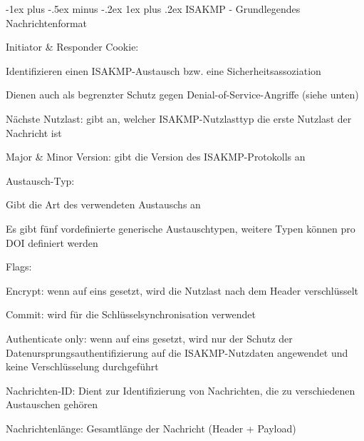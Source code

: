 \documentclass[a4paper]{article}
\makeatletter
\renewcommand{\subsubsection}{\@startsection{subsubsection}{3}{0mm}%
 {-1ex plus -.5ex minus -.2ex}%
 {1ex plus .2ex}%
 {\normalfont\small\bfseries}}
\makeatother
\begin{document}
\begin{multicols}{3}
      \subsubsection{ISAKMP - Grundlegendes Nachrichtenformat}
      \begin{itemize*}
            \item Initiator \& Responder Cookie:
            \begin{itemize*}
                  \item Identifizieren einen ISAKMP-Austausch bzw. eine Sicherheitsassoziation
                  \item Dienen auch als begrenzter Schutz gegen Denial-of-Service-Angriffe (siehe unten)
            \end{itemize*}
            \item Nächste Nutzlast: gibt an, welcher ISAKMP-Nutzlasttyp die erste Nutzlast der Nachricht ist
            \item Major \& Minor Version: gibt die Version des ISAKMP-Protokolls an
            \item Austausch-Typ:
            \begin{itemize*}
                  \item Gibt die Art des verwendeten Austauschs an
                  \item Es gibt fünf vordefinierte generische Austauschtypen, weitere Typen können pro DOI definiert werden
            \end{itemize*}
            \item Flags:
            \begin{itemize*}
                  \item Encrypt: wenn auf eins gesetzt, wird die Nutzlast nach dem Header verschlüsselt
                  \item Commit: wird für die Schlüsselsynchronisation verwendet
                  \item Authenticate only: wenn auf eins gesetzt, wird nur der Schutz der Datenursprungsauthentifizierung auf die ISAKMP-Nutzdaten angewendet und keine Verschlüsselung durchgeführt
            \end{itemize*}
            \item Nachrichten-ID: Dient zur Identifizierung von Nachrichten, die zu verschiedenen Austauschen gehören
            \item Nachrichtenlänge: Gesamtlänge der Nachricht (Header + Payload)

\end{itemize*}
\end{multicols}
\end{document}
